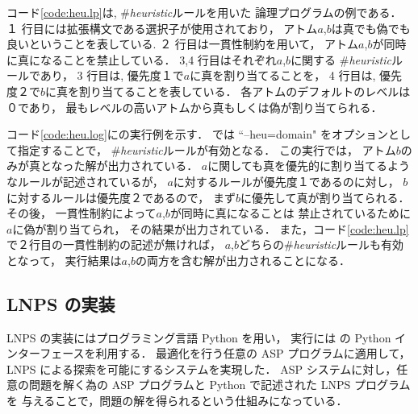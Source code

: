 コード\ref{code:heu.lp}は, \#\textit{heuristic}ルールを用いた
論理プログラムの例である．
１ 行目には拡張構文である選択子が使用されており，
アトム$a$,$b$は真でも偽でも良いということを表している. 
２ 行目は一貫性制約を用いて，
アトム$a$,$b$が同時に真になることを禁止している．
3,4 行目はそれぞれ$a$,$b$に関する
\#\textit{heuristic}ルールであり，
3 行目は, 優先度１で$a$に真を割り当てることを，
4 行目は, 優先度２で$b$に真を割り当てることを表している．
各アトムのデフォルトのレベルは０であり，
最もレベルの高いアトムから真もしくは偽が割り当てられる．

コード\ref{code:heu.log}に{\clingo}の実行例を示す．
{\clingo}では ``--heu=domain" をオプションとして指定することで，
\#\textit{heuristic}ルールが有効となる．
この実行では，
アトム$b$のみが真となった解が出力されている．
$a$に関しても真を優先的に割り当てるようなルールが記述されているが，
$a$に対するルールが優先度１であるのに対し，
$b$に対するルールは優先度２であるので，
まず$b$に優先して真が割り当てられる．
その後，
一貫性制約によって$a$,$b$が同時に真になることは
禁止されているために
$a$に偽が割り当てられ，
その結果が出力されている．
また，コード\ref{code:heu.lp}で２行目の一貫性制約の記述が無ければ，
$a$,$b$どちらの\#\textit{heuristic}ルールも有効となって，
実行結果は$a$,$b$の両方を含む解が出力されることになる．




\subsection{LNPS の実装}
LNPS の実装にはプログラミング言語 Python を用い，
実行には {\clingo} の Python インターフェースを利用する．
最適化を行う任意の ASP プログラムに適用して，LNPS による探索を可能にするシステムを実現した．
ASP システムに対し，任意の問題を解く為の ASP プログラムと Python で記述された LNPS プログラムを
与えることで，問題の解を得られるという仕組みになっている．

